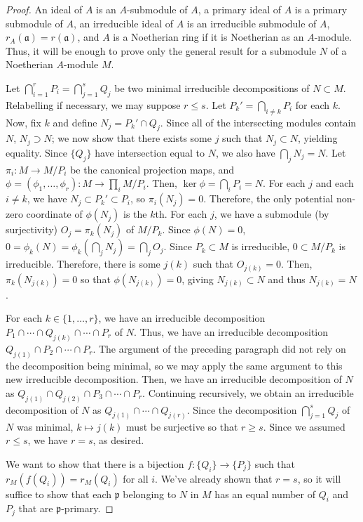 \begin{proof}
An ideal of $A$ is an $A$-submodule of $A$, a primary ideal of $A$ is a primary submodule of $A$, an irreducible ideal of $A$ is an irreducible
submodule of $A$, $r_A(\mathfrak{a}) = r(\mathfrak{a})$, and $A$ is a Noetherian ring if it is Noetherian as an $A$-module. Thus, it will be enough
to prove only the general result for a submodule $N$ of a Noetherian $A$-module $M$. 

Let $\bigcap_{i=1}^r P_i = \bigcap_{j=1}^s Q_j$ be two minimal irreducible decompositions of $N \subset M$. Relabelling if necessary, we may suppose $r \le s$.
Let $P_k' = \bigcap_{i \neq k} P_i$ for each $k$. Now, fix $k$ and define $N_j = P_k' \cap Q_j$. Since all of the intersecting modules contain $N$, $N_j \supset N$; we now 
show that there exists some $j$ such that $N_j \subset N$, yielding equality. Since $\{Q_j\}$ have intersection equal to $N$, we also have 
$\bigcap_j N_j = N$. Let $\pi_i : M \to M/P_i$ be the canonical projection maps, and $\phi = (\phi_1,\ldots,\phi_r) : M \to \prod_i M/P_i$. Then, $\ker \phi = \bigcap_i P_i = N$.
For each $j$ and each $i \neq k$, we have $N_j \subset P_k' \subset P_i$, so $\pi_i(N_j) = 0$. Therefore, the only potential non-zero coordinate of 
$\phi(N_j)$ is the $k$th. For each $j$, we have a submodule (by surjectivity) $O_j = \pi_k(N_j)$ of $M/P_k$. Since $\phi(N) = 0$, $0 = \phi_k(N) = \phi_k(\bigcap_j N_j) = \bigcap_j O_j$.
Since $P_k \subset M$ is irreducible, $0 \subset M/P_k$ is irreducible. Therefore, there is some $j(k)$ such that $O_{j(k)} = 0$. Then, $\pi_k(N_{j(k)}) = 0$
so that $\phi(N_{j(k)}) = 0$, giving $N_{j(k)} \subset N$ and thus $N_{j(k)} = N$.

For each $k \in \{1,\ldots,r\}$, we have an irreducible decomposition $P_1 \cap \cdots \cap Q_{j(k)} \cap \cdots \cap P_r$ of $N$. Thus, we have an irreducible decomposition
$Q_{j(1)} \cap P_2 \cap \cdots \cap P_r$. The argument of the preceding paragraph did not rely on the decomposition being minimal, so we may apply the same argument to this new 
irreducible decomposition. Then, we have an irreducible decomposition of $N$ as $Q_{j(1)} \cap Q_{j(2)} \cap P_3 \cap \cdots \cap P_r$. Continuing recursively, we obtain an 
irreducible decomposition of $N$ as $Q_{j(1)} \cap \cdots \cap Q_{j(r)}$. Since the decomposition $\bigcap_{j=1}^s Q_j$ of $N$ was minimal, $k \mapsto j(k)$ must be surjective 
so that $r \ge s$. Since we assumed $r \le s$, we have $r=s$, as desired.

We want to show that there is a bijection $f : \{Q_i\} \to \{P_j\}$ such that $r_M(f(Q_i)) = r_M(Q_i)$ for all $i$. We've already shown that $r = s$, so it will suffice to show
that each $\mathfrak{p}$ belonging to $N$ in $M$ has an equal number of $Q_i$ and $P_j$ that are $\mathfrak{p}$-primary.


\end{proof}
